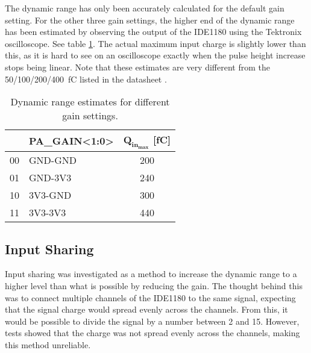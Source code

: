 \documentclass[../main/thesis.tex]{subfiles}
\begin{document}
The dynamic range has only been accurately calculated for the default gain setting. For the other three gain settings, the higher end of the dynamic range has been estimated by observing the output of the IDE1180 using the Tektronix oscilloscope. See table \ref{tab-dynrange-estimate}. The actual maximum input charge is slightly lower than this, as it is hard to see on an oscilloscope exactly when the pulse height increase stops being linear. Note that these estimates are very different from the 50/100/200/400~fC listed in the datasheet \citep{IDE1180}. 
\begin{table}[h!]
	\begin{center}
		\caption{Dynamic range estimates for different gain settings.}
		\label{tab-dynrange-estimate}
		\begin{tabular}{clc}\toprule
			&\textbf{PA\_GAIN<1:0>} & \textbf{$\mathbf{Q_{in_{max}}}$ [fC]}   \\ \midrule
		    00&GND-GND     & 200   \\
			01&GND-3V3     & 240       \\
			10&3V3-GND     & 300    \\
			11&3V3-3V3     & 440   \\ \bottomrule
		\end{tabular}
	\end{center}
\end{table}

\subsection{Input Sharing}
\label{ide-inputshare}

Input sharing was investigated as a method to increase the dynamic range to a higher level than what is possible by reducing the gain. The thought behind this was to connect multiple channels of the IDE1180 to the same signal, expecting that the signal charge would spread evenly across the channels. From this, it would be possible to divide the signal by a number between 2 and 15. However, tests showed that the charge was not spread evenly across the channels, making this method unreliable. 

\end{document}
